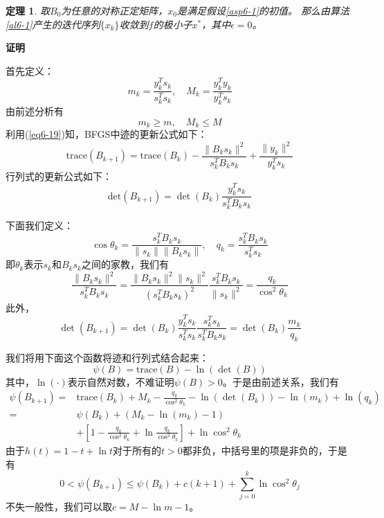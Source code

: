 \documentclass{article}
\newtheorem{thm}{定理}
\begin{document}
\begin{thm}
  \label{thm6-5}
  取$B_0$为任意的对称正定矩阵，$x_0$是满足假设\ref{asp6-1}的初值。
  那么由算法\ref{al6-1}产生的迭代序列$\{x_k\}$收敛到$f$的极小子$x^*$，其中$\epsilon = 0$。
\end{thm}

\textbf{证明}

首先定义：
\begin{equation}
  \label{eq6-42}
  m_k = \frac{y_k^Ts_k}{s_k^Ts_k}, \quad M_k = \frac{y_k^Ty_k}{y_k^Ts_k}
\end{equation}
由前述分析有
\begin{equation}
  \label{eq6-43}
  m_k \ge m, \quad M_k \le M
\end{equation}
利用(\ref{eq6-19})知，BFGS中迹的更新公式如下：
\begin{equation}
  \label{eq6-44}
  \text{trace}(B_{k+1}) = \text{trace}(B_k) - \frac{\|B_ks_k\|^2}{s_k^TB_ks_k}
  + \frac{\|y_k\|^2}{y_k^Ts_k}
\end{equation}
行列式的更新公式如下：
\begin{equation}
  \label{eq6-45}
  \text{det}(B_{k+1}) = \det(B_k)\frac{y_k^Ts_k}{s_k^TB_ks_k}
\end{equation}

下面我们定义：
\begin{equation}
  \label{eq6-46}
  \cos \theta_k = \frac{s_k^T B_ks_k}{\|s_k\|\|B_ks_k\|},
  \quad q_k = \frac{s_k^TB_ks_k}{s_k^Ts_k}
\end{equation}
即$\theta_k$表示$s_k$和$B_ks_k$之间的家教，我们有
\begin{equation}
  \label{eq6-47}
  \frac{\|B_ks_k\|^2}{s_k^TB_ks_k}
  = \frac{\|B_ks_k\|^2\|s_k\|^2}{(s_k^TB_ks_k)^2}\frac{s_k^TB_ks_k}{\|s_k\|^2}
  = \frac{q_k}{\cos^2\theta_k}
\end{equation}
此外，
\begin{equation}
  \label{eq6-48}
  \det(B_{k+1}) = \det(B_k)\frac{y_k^Ts_k}{s_k^Ts_k}\frac{s_k^Ts_k}{s_k^TB_ks_k}
  = \det(B_k)\frac{m_k}{q_k}
\end{equation}

我们将用下面这个函数将迹和行列式结合起来：
\begin{equation}
  \label{eq6-49}
  \psi(B) = \text{trace}(B) - \ln(\det(B))
\end{equation}
其中，$\ln(\cdot)$表示自然对数，不难证明$\psi(B)>0$。于是由前述关系，我们有
\begin{equation}
  \label{eq6-50}
  \begin{split}
    \psi(B_{k+1}) = & \text{trace}(B_k) + M_k - \frac{q_k}{\cos^2\theta_k}
    - \ln(\det(B_k)) - \ln(m_k) + \ln(q_k)\\
    = & \psi(B_k) + (M_k - \ln(m_k) - 1)\\
    & + \left[1 - \frac{q_k}{\cos^2\theta_k} + \ln\frac{q_k}{\cos^2\theta_k}\right] + \ln \cos^2\theta_k
  \end{split}
\end{equation}
由于$h(t) = 1-t+\ln t$对于所有的$t>0$都非负，中括号里的项是非负的，于是有
\begin{equation}
  \label{eq6-51}
  0 < \psi(B_{k+1}) \le \psi(B_k) + c(k+1) + \sum_{j=0}^k \ln \cos^2\theta_j
\end{equation}
不失一般性，我们可以取$c = M-\ln m - 1$。
\end{document}
